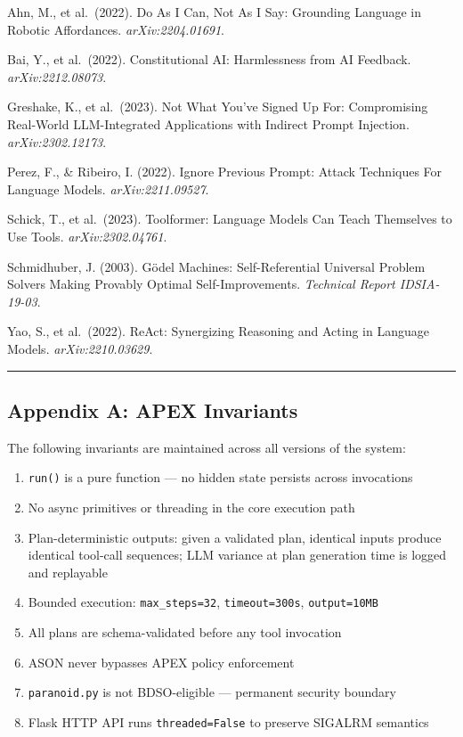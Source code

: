 Ahn, M., et al.~(2022). Do As I Can, Not As I Say: Grounding Language in
Robotic Affordances. \emph{arXiv:2204.01691}.

Bai, Y., et al.~(2022). Constitutional AI: Harmlessness from AI
Feedback. \emph{arXiv:2212.08073}.

Greshake, K., et al.~(2023). Not What You've Signed Up For: Compromising
Real-World LLM-Integrated Applications with Indirect Prompt Injection.
\emph{arXiv:2302.12173}.

Perez, F., \& Ribeiro, I. (2022). Ignore Previous Prompt: Attack
Techniques For Language Models. \emph{arXiv:2211.09527}.

Schick, T., et al.~(2023). Toolformer: Language Models Can Teach
Themselves to Use Tools. \emph{arXiv:2302.04761}.

Schmidhuber, J. (2003). Gödel Machines: Self-Referential Universal
Problem Solvers Making Provably Optimal Self-Improvements.
\emph{Technical Report IDSIA-19-03}.

Yao, S., et al.~(2022). ReAct: Synergizing Reasoning and Acting in
Language Models. \emph{arXiv:2210.03629}.

\begin{center}\rule{0.5\linewidth}{0.5pt}\end{center}

\subsection{Appendix A: APEX
Invariants}\label{appendix-a-apex-invariants}

The following invariants are maintained across all versions of the
system:

\begin{enumerate}
\def\labelenumi{\arabic{enumi}.}
\tightlist
\item
  \texttt{run()} is a pure function --- no hidden state persists across
  invocations
\item
  No async primitives or threading in the core execution path
\item
  Plan-deterministic outputs: given a validated plan, identical inputs
  produce identical tool-call sequences; LLM variance at plan generation
  time is logged and replayable
\item
  Bounded execution: \texttt{max\_steps=32}, \texttt{timeout=300s},
  \texttt{output=10MB}
\item
  All plans are schema-validated before any tool invocation
\item
  ASON never bypasses APEX policy enforcement
\item
  \texttt{paranoid.py} is not BDSO-eligible --- permanent security
  boundary
\item
  Flask HTTP API runs \texttt{threaded=False} to preserve SIGALRM
  semantics
\end{enumerate}

